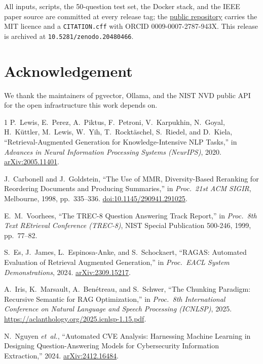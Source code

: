 \documentclass[conference]{IEEEtran}
\begin{document}
All inputs, scripts, the 50-question test set, the Docker stack,
and the IEEE paper source are committed at every release tag; the
\href{https://github.com/thunderstornX/rag-threat-intel}{public
repository} carries the MIT licence and a \texttt{CITATION.cff}
with ORCID 0009-0007-2787-943X. This release is archived at
\texttt{10.5281/zenodo.20480466}.

\section*{Acknowledgement}

We thank the maintainers of pgvector, Ollama, and the NIST NVD
public API for the open infrastructure this work depends on.

\begin{thebibliography}{1}
P.~Lewis, E.~Perez, A.~Piktus, F.~Petroni, V.~Karpukhin, N.~Goyal,
H.~K\"uttler, M.~Lewis, W.~Yih, T.~Rockt\"aschel, S.~Riedel, and
D.~Kiela, ``Retrieval-Augmented Generation for Knowledge-Intensive
NLP Tasks,'' in \emph{Advances in Neural Information Processing
Systems (NeurIPS)}, 2020.
\href{https://arxiv.org/abs/2005.11401}{arXiv:2005.11401}.

J.~Carbonell and J.~Goldstein, ``The Use of MMR, Diversity-Based
Reranking for Reordering Documents and Producing Summaries,'' in
\emph{Proc.\ 21st ACM SIGIR}, Melbourne, 1998, pp.~335--336.
\href{https://doi.org/10.1145/290941.291025}{doi:10.1145/290941.291025}.

E.~M.~Voorhees, ``The TREC-8 Question Answering Track Report,'' in
\emph{Proc.\ 8th Text REtrieval Conference (TREC-8)}, NIST Special
Publication 500-246, 1999, pp.~77--82.

S.~Es, J.~James, L.~Espinosa-Anke, and S.~Schockaert, ``RAGAS:
Automated Evaluation of Retrieval Augmented Generation,'' in
\emph{Proc.\ EACL System Demonstrations}, 2024.
\href{https://arxiv.org/abs/2309.15217}{arXiv:2309.15217}.

A.~Iris, K.~Marsault, A.~Ben\'etreau, and S.~Schwer, ``The Chunking
Paradigm: Recursive Semantic for RAG Optimization,'' in
\emph{Proc.\ 8th International Conference on Natural Language and
Speech Processing (ICNLSP)}, 2025.
\url{https://aclanthology.org/2025.icnlsp-1.15.pdf}.

N.~Nguyen \emph{et~al.}, ``Automated CVE Analysis: Harnessing
Machine Learning in Designing Question-Answering Models for
Cybersecurity Information Extraction,'' 2024.
\href{https://arxiv.org/abs/2412.16484}{arXiv:2412.16484}.
\end{thebibliography}
\end{document}

